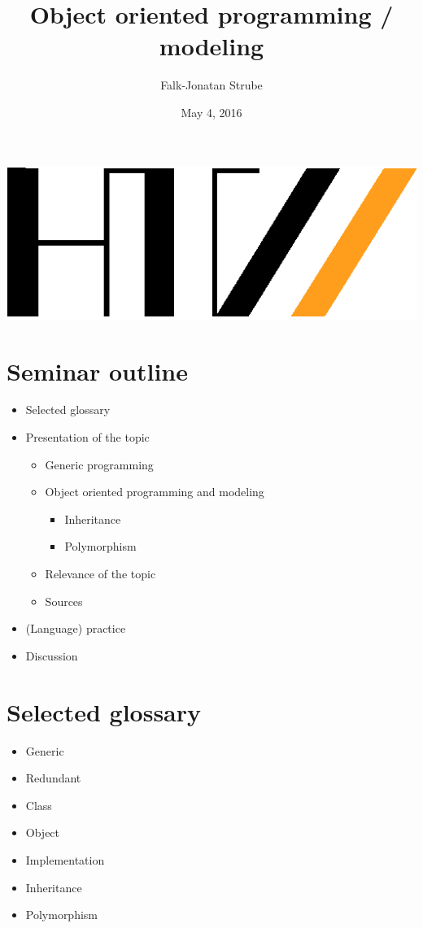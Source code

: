 



\title{Object oriented programming / modeling}
\author{Falk-Jonatan Strube}
\date{May 4, 2016} 



\begin{frame}[plain]
\begin{center}
\includegraphics[width=.3\textwidth]{../../../LaTeX_master/HTW-Logo.eps}
\end{center}
\maketitle
\end{frame}
\section*{Seminar outline}
\begin{frame}
\begin{itemize}
\setlength\itemsep{1em}
\item Selected glossary
\item Presentation of the topic
\begin{itemize}
\item Generic programming
\item Object oriented programming and modeling
\begin{itemize}
\item Inheritance
\item Polymorphism
\end{itemize}
\item Relevance of the topic
\item Sources
\end{itemize}
\item (Language) practice
\item Discussion
\end{itemize}
\end{frame}

\section*{Selected glossary}
\begin{frame}
\begin{itemize}
\setlength\itemsep{1em}
\item Generic
\item Redundant
\item Class
\item Object
\item Implementation
\item Inheritance
\item Polymorphism
\end{itemize}
\end{frame}

